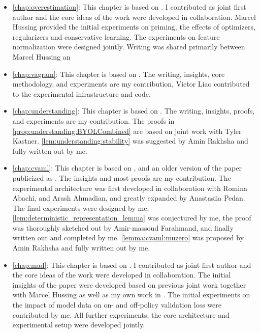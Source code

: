 \begin{itemize}
    \item \autoref{chap:overestimation}: This chapter is based on . I contributed as joint first author and the core ideas of the work were developed in collaboration. Marcel Hussing provided the initial experiments on priming, the effects of optimizers, regularizers and conservative learning. The experiments on feature normalization were designed jointly. Writing was shared primarily between Marcel Hussing an
    \item \autoref{chap:vagram}: This chapter is based on . The writing, insights, core methodology, and experiments are my contribution, Victor Liao contributed to the experimental infrastructure and code.
    \item \autoref{chap:understanding}: This chapter is based on . The writing, insights, proofs, and experiments are my contribution. The proofs in \autoref{prop:understanding:BYOLCombined} are based on joint work with Tyler Kastner. \autoref{lem:understanding:stability} was suggested by Amin Rakhsha and fully written out by me.
    \item \autoref{chap:cvaml}: This chapter is based on , and an older version of the paper publicized as . The insights and most proofs are my contribution. The experimental architecture was first developed in collaboration with Romina Abachi, and Arash Ahmadian, and greatly expanded by Anastasiia Pedan. The final experiments were designed by me. \autoref{lem:deterministic_representation_lemma} was conjectured by me, the proof was thoroughly sketched out by Amir-massoud Farahmand, and finally written out and completed by me. \autoref{lemma:cvaml:muzero} was proposed by Amin Rakhsha and fully written out by me.
    \item \autoref{chap:mad}: This chapter is based on . I contributed as joint first author and the core ideas of the work were developed in collaboration. The initial insights of the paper were developed based on previous joint work \cite{hussing2024dissecting} together with Marcel Hussing as well as my own work in \textcite{voelcker2023lambda}. The initial experiments on the impact of model data on on- and off-policy validation loss were contributed by me. All further experiments, the core architecture and experimental setup were developed jointly.
\end{itemize}

